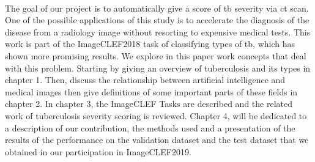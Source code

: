 \paragraph{}
The goal of our project is to automatically give a score of \ac{tb} severity via \ac{ct} scan. One of the possible applications of this study is to accelerate the diagnosis of the disease from a radiology image without resorting to expensive medical tests. This work is part of the ImageCLEF2018  task of classifying types of \ac{tb}, which has shown more promising results. We explore in this paper work concepts that deal with this problem. Starting by giving an overview of tuberculosis and its types in chapter 1. Then, discuss the relationship between artificial intelligence and medical images then give definitions of some important parts of these fields in chapter 2. In chapter 3, the ImageCLEF Tasks are described and the related work of tuberculosis severity scoring is reviewed. Chapter 4, will be dedicated to a description of our contribution, the methods used and a presentation of the results of the performance on the validation dataset and the test dataset that we obtained in our participation in ImageCLEF2019\cite{ImageCLEF:1}.